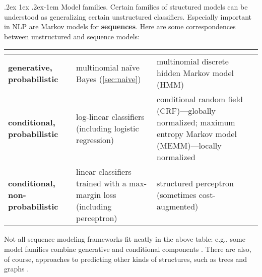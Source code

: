 \documentclass[11pt,letterpaper]{article}
\makeatletter
\newcommand{\ensuretext}[1]{#1}
\newcommand{\nssmarker}{\ensuretext{\textcolor{magenta}{\ensuremath{^{\textsc{NS}}_{\textsc{S}}}}}}
\newcommand{\arkcomment}[3]{\ensuretext{\textcolor{#3}{[#1 #2]}}}
\newcommand{\nss}[1]{\arkcomment{\nssmarker}{#1}{magenta}}
\renewcommand{\paragraph}{%
  \@startsection{paragraph}{4}%
  {\z@}{.2ex \@plus 1ex \@minus .2ex}{-1em}%
  {\normalfont\normalsize\bfseries}%
}
\makeatother
\begin{document}
\paragraph{Model families.} 
Certain families of structured models can be understood as generalizing certain unstructured classifiers.
Especially important in NLP are Markov models for \textbf{sequences}. 
Here are some correspondences between unstructured and sequence models:
%
\begin{center}\small
\begin{tabular}{@{}>{\raggedright\bf}p{9em}>{\raggedright}p{13em}@{~~}>{\raggedright\arraybackslash}p{16em}@{}}
& \multicolumn{1}{c}{Unstructured} & \multicolumn{1}{c}{Sequence} \\
\hline
generative, probabilistic & multinomial na\"{i}ve Bayes (\cref{sec:naive}) & {\raggedright multinomial discrete hidden Markov model (HMM)} \\
\hline
conditional, probabilistic & log-linear classifiers (including logistic regression) & conditional random field (CRF)---globally normalized; 
maximum entropy Markov model (MEMM)---locally normalized \\
\hline
conditional, non-probabilistic & linear classifiers trained with a max-margin loss (including perceptron) & structured perceptron \citep{collins-02} (sometimes cost-augmented) \\
\hline
\end{tabular}
\end{center}
%
Not all sequence modeling frameworks fit neatly in the above table: e.g., some model families combine 
generative and conditional components \citep{berg-kirkpatrick-10,ammar-14}.
There are also, of course, approaches to predicting other kinds of structures, 
such as trees \citep[in syntactic parsing: e.g.,][]{charniak-05,mcdonald-05} 
and graphs \citep[in semantic parsing: e.g.,][]{flanigan-14}.





\end{document}
